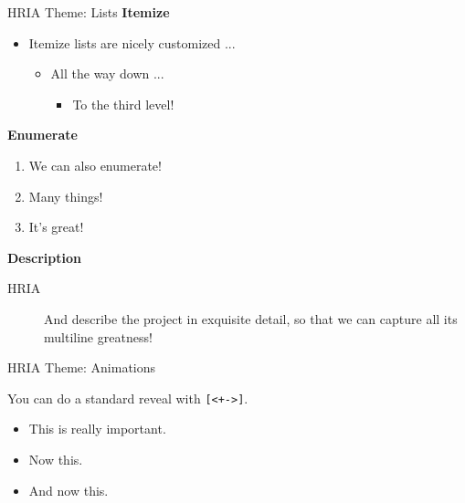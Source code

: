 \documentclass[aspectratio=169]{beamer}
\begin{document}
\begin{frame}{HRIA Theme: Lists}
\textbf{Itemize}

\begin{itemize}
    \item Itemize lists are nicely customized ...
    \begin{itemize}
        \item All the way down ...
        \begin{itemize}
            \item To the third level!
        \end{itemize}
    \end{itemize}
\end{itemize}

\textbf{Enumerate}

\begin{enumerate}
    \item We can also enumerate!
    \item Many things!
    \item It's great!
\end{enumerate}

\textbf{Description}

\begin{description}
    \item[HRIA] And describe the project in exquisite detail, so that we
        can capture all its multiline greatness!
\end{description}
\end{frame}

\begin{frame}{HRIA Theme: Animations}

You can do a standard reveal with \texttt{[<+->]}.
\bigskip

\begin{itemize}[<+->]
    \item This is\alert<4>{ really} important.
    \item Now this.
    \item And now this.
\end{itemize}

\end{frame}
\end{document}
